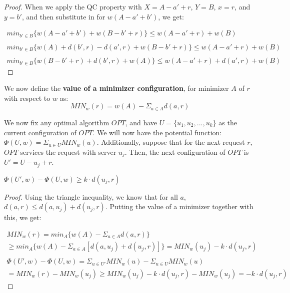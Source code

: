 \begin{proof}
    When we apply the QC property with $X = A - a' + r$, $Y = B$, $x = r$, and $y = b'$, and then substitute in for $w(A - a' + b')$, we get:

    \begin{equation*}
        \begin{gathered}
            min_{b' \in B} \{ w(A - a' + b') + w(B - b' + r)\} \leq w(A - a' + r) + w(B) \\ \\
            min_{b' \in B} \{ w(A) + d(b', r) - d(a', r) + w(B - b' + r)\}\leq w(A - a' + r) + w(B) \\ \\
            min_{b' \in B} \{ w(B - b' + r) + d(b', r) + w(A)\} \leq w(A - a' + r) + d(a', r) + w(B)
        \end{gathered}
    \end{equation*}
\end{proof}

\begin{definition}
    \label{eq:MIN}
    We now define the \textbf{value of a minimizer configuration}, for minimizer $A$ of $r$ with respect to $w$ as: 
    \begin{equation*}
        MIN_w(r) = w(A) - \Sigma_{a \in A} d(a, r)
    \end{equation*}
\end{definition}

We now fix any optimal algorithm $OPT$, and have $U = \{u_1, u_2, ... , u_k \}$ as the current configuration of $OPT$. We will now have the potential function: $\Phi ( U, w) = \Sigma_{u \in U} MIN_w(u)$. Additionally, suppose that for the next request $r$, $OPT$ services the request with server $u_j$. Then, the next configuration of $OPT$ is $U' = U - u_j + r$.

\begin{lemma}
    \label{lem:ep1}
    $\Phi ( U', w) - \Phi (U, w) \geq k \cdot d(u_j, r)$
\end{lemma}

\begin{proof}
    Using the triangle inequality, we know that for all $a$, $d(a, r) \leq d(a, u_j) + d(u_j, r)$. Putting the value of a minimizer together with this, we get:

    \begin{equation*}
        \begin{gathered}
            MIN_w(r) = min_A \{ w(A) - \Sigma_{a \in A} d(a, r)\} \\
            \geq min_A \{ w(A) - \Sigma_{a \in A} [d(a, u_j) + d(u_j, r)]\} = MIN_w(u_j) - k\cdot d(u_j, r) \\ \\
            \Phi ( U', w) - \Phi (U, w) = \Sigma_{u \in U'} MIN_w(u) - \Sigma_{u \in U} MIN_w(u) \\ = MIN_w(r) - MIN_w(u_j) \geq MIN_w(u_j) - k \cdot  d(u_j, r) - MIN_w(u_j) = -k\cdot d(u_j, r)
        \end{gathered}
    \end{equation*}
\end{proof}

